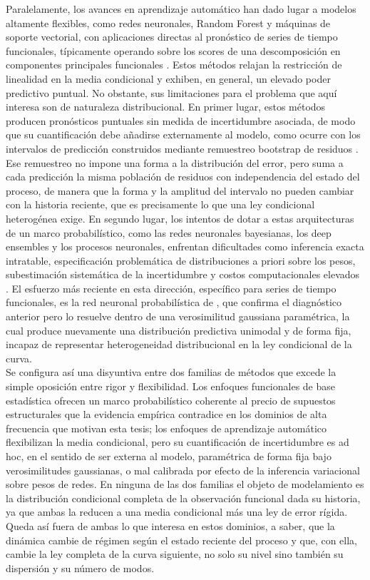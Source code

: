 Paralelamente, los avances en aprendizaje automático han dado lugar a modelos altamente flexibles, como redes neuronales, Random Forest y máquinas de soporte vectorial, con aplicaciones directas al pronóstico de series de tiempo funcionales, típicamente operando sobre los scores de una descomposición en componentes principales funcionales \citep{03_00_forecast4010022}. Estos métodos relajan la restricción de linealidad en la media condicional y exhiben, en general, un elevado poder predictivo puntual. No obstante, sus limitaciones para el problema que aquí interesa son de naturaleza distribucional. En primer lugar, estos métodos producen pronósticos puntuales sin medida de incertidumbre asociada, de modo que su cuantificación debe añadirse externamente al modelo, como ocurre con los intervalos de predicción construidos mediante remuestreo bootstrap de residuos \citep{03_00_forecast4010022}. Ese remuestreo no impone una forma a la distribución del error, pero suma a cada predicción la misma población de residuos con independencia del estado del proceso, de manera que la forma y la amplitud del intervalo no pueden cambiar con la historia reciente, que es precisamente lo que una ley condicional heterogénea exige. En segundo lugar, los intentos de dotar a estas arquitecturas de un marco probabilístico, como las redes neuronales bayesianas, los deep ensembles y los procesos neuronales, enfrentan dificultades como inferencia exacta intratable, especificación problemática de distribuciones a priori sobre los pesos, subestimación sistemática de la incertidumbre y costos computacionales elevados \citep{03_00_kamarthi2021doubt}. El esfuerzo más reciente en esta dirección, específico para series de tiempo funcionales, es la red neuronal probabilística de \citet{03_00_wang2025profnet}, que confirma el diagnóstico anterior pero lo resuelve dentro de una verosimilitud gaussiana paramétrica, la cual produce nuevamente una distribución predictiva unimodal y de forma fija, incapaz de representar heterogeneidad distribucional en la ley condicional de la curva.\\
 
Se configura así una disyuntiva entre dos familias de métodos que excede la simple oposición entre rigor y flexibilidad. Los enfoques funcionales de base estadística ofrecen un marco probabilístico coherente al precio de supuestos estructurales que la evidencia empírica contradice en los dominios de alta frecuencia que motivan esta tesis; los enfoques de aprendizaje automático flexibilizan la media condicional, pero su cuantificación de incertidumbre es ad hoc, en el sentido de ser externa al modelo, paramétrica de forma fija bajo verosimilitudes gaussianas, o mal calibrada por efecto de la inferencia variacional sobre pesos de redes. En ninguna de las dos familias el objeto de modelamiento es la distribución condicional completa de la observación funcional dada su historia, ya que ambas la reducen a una media condicional más una ley de error rígida. Queda así fuera de ambas lo que interesa en estos dominios, a saber, que la dinámica cambie de régimen según el estado reciente del proceso y que, con ella, cambie la ley completa de la curva siguiente, no solo su nivel sino también su dispersión y su número de modos.
 
